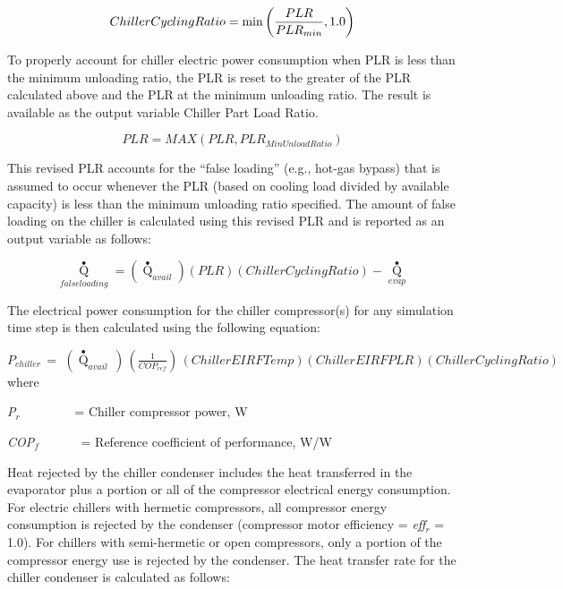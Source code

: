 \begin{equation}
  ChillerCyclingRatio = \min \PB{ \frac{PLR}{PLR_{min}}, 1.0 }
\end{equation}

To properly account for chiller electric power consumption when PLR is less than the minimum unloading ratio, the PLR is reset to the greater of the PLR calculated above and the PLR at the minimum unloading ratio. The result is available as the output variable Chiller Part Load Ratio.

\begin{equation}
PLR = MAX(PLR,PL{R_{MinUnloadRatio}})
\end{equation}

This revised PLR accounts for the ``false loading'' (e.g., hot-gas bypass) that is assumed to occur whenever the PLR (based on cooling load divided by available capacity) is less than the minimum unloading ratio specified. The amount of false loading on the chiller is calculated using this revised PLR and is reported as an output variable as follows:

\begin{equation}
{\mathop Q\limits^ \bullet_{falseloading}} = \left( {{{\mathop Q\limits^ \bullet  }_{avail}}} \right)\left( {PLR} \right)\left( {ChillerCyclingRatio} \right) - {\mathop Q\limits^ \bullet_{evap}}
\end{equation}

The electrical power consumption for the chiller compressor(s) for any simulation time step is then calculated using the following equation:

\({P_{chiller}}\, = \,\,\left( {{{\mathop Q\limits^ \bullet }_{avail}}\,} \right)\,\left( {\frac{1}{{CO{P_{ref}}}}} \right)\,\left( {ChillerEIRFTemp} \right)\left( {ChillerEIRFPLR} \right)\left( {ChillerCyclingRatio} \right)\) where

\emph{P\(_{r}\)}~~~~~~~~ = Chiller compressor power, W

\emph{COP\(_{f}\)}~~~~~~ = Reference coefficient of performance, W/W

Heat rejected by the chiller condenser includes the heat transferred in the evaporator plus a portion or all of the compressor electrical energy consumption. For electric chillers with hermetic compressors, all compressor energy consumption is rejected by the condenser (compressor motor efficiency = \emph{eff\(_{r}\)} = 1.0). For chillers with semi-hermetic or open compressors, only a portion of the compressor energy use is rejected by the condenser. The heat transfer rate for the chiller condenser is calculated as follows:

